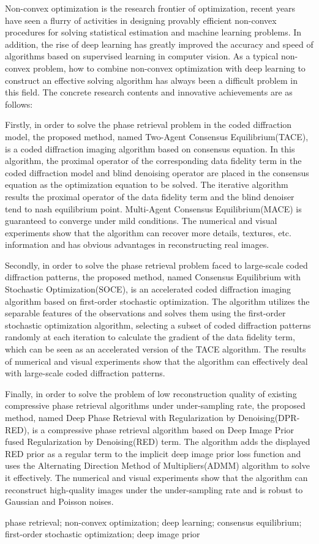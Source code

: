 \begin{englishabstract}
Non-convex optimization is the research frontier of optimization, recent years have seen a flurry of activities in designing provably efficient non-convex procedures for solving statistical estimation and machine learning problems. In addition, the rise of deep learning has greatly improved the accuracy and speed of algorithms based on supervised learning in computer vision. As a typical non-convex problem, how to combine non-convex optimization with deep learning to construct an effective solving algorithm has always been a difficult problem in this field. The concrete research contents and innovative achievements are as follows: 

Firstly, in order to solve the phase retrieval problem in the coded diffraction model, the proposed method, named Two-Agent Consensus Equilibrium(TACE), is a coded diffraction imaging algorithm based on consensus equation. In this algorithm, the proximal operator of the corresponding data fidelity term in the coded diffraction model and blind denoising operator are placed in the consensus equation as the optimization equation to be solved. The iterative algorithm results the proximal operator of the data fidelity term and the blind denoiser tend to nash equilibrium point. Multi-Agent Consensus Equilibrium(MACE) is guaranteed to converge under mild conditions. The numerical and visual experiments show that the algorithm can recover more details, textures, etc. information and has obvious advantages in reconstructing real images. 

Secondly, in order to solve the phase retrieval problem faced to large-scale coded diffraction patterns, the proposed method, named Consensus Equilibrium with Stochastic Optimization(SOCE), is an accelerated coded diffraction imaging algorithm based on first-order stochastic optimization. The algorithm utilizes the separable features of the observations and solves them using the first-order stochastic optimization algorithm, selecting a subset of coded diffraction patterns randomly at each iteration to calculate the gradient of the data fidelity term, which can be seen as an accelerated version of the TACE algorithm. The results of numerical and visual experiments show that the algorithm can effectively deal with large-scale coded diffraction patterns. 

Finally, in order to solve the problem of low reconstruction quality of existing compressive phase retrieval algorithms under under-sampling rate, the proposed method, named Deep Phase Retrieval with Regularization by Denoising(DPR-RED), is a compressive phase retrieval algorithm based on Deep Image Prior fused Regularization by Denoising(RED) term. The algorithm adds the displayed RED prior as a regular term to the implicit deep image prior loss function and uses the Alternating Direction Method of Multipliers(ADMM) algorithm to solve it effectively. The numerical and visual experiments show that the algorithm can reconstruct high-quality images under the under-sampling rate and is robust to Gaussian and Poisson noises. 
\end{englishabstract}

\begin{englishkeywords}
phase retrieval; non-convex optimization; deep learning; consensus equilibrium; first-order stochastic optimization; deep image prior
\end{englishkeywords} 

\cleardoublepage